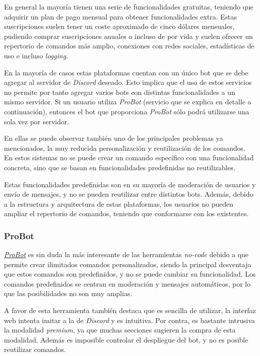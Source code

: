 En general la mayoría tienen una serie de funcionalidades gratuitas, teniendo que adquirir un plan de pago mensual para obtener funcionalidades extra. Estas suscripciones suelen tener un coste aproximado de cinco dólares mensuales, pudiendo comprar suscripciones anuales o incluso de por vida y suelen ofrecer un repertorio de comandos más amplio, conexiones con redes sociales, estadísticas de uso e incluso \textit{logging}.

En la mayoría de casos estas plataformas cuentan con un único bot que se debe agregar al servidor de \textit{Discord} deseado. Esto implica que el uso de estos servicios no permite por tanto agregar varios bots con distintas funcionalidades a un mismo servidor. Si un usuario utiliza \textit{ProBot} (servicio que se explica en detalle a continuación), entonces el bot que proporciona \textit{ProBot} sólo podrá utilizarse una sola vez por servidor.

En ellas se puede observar también uno de los principales problemas ya mencionados, la muy reducida personalización y reutilización de los comandos. En estos sistemas no se puede crear un comando específico con una funcionalidad concreta, sino que se basan en funcionalidades predefinidas no reutilizables.

Estas funcionalidades predefinidas son en su mayoría de moderación de usuarios y envío de mensajes, y no se pueden reutilizar entre distintos bots. Además, debido a la estructura y arquitectura de estas plataformas, los usuarios no pueden ampliar el repertorio de comandos, teniendo que conformarse con los existentes.

\subsubsection{ProBot}

\href{https://probot.io/}{\textit{ProBot}} es sin duda la más interesante de las herramientas \textit{no-code} debido a que permite crear ilimitados comandos personalizados, siendo la principal desventaja que estos comandos son predefinidos, y no se puede cambiar su funcionalidad. Los comandos predefinidos se centran en moderación y mensajes automáticos, por lo que las posibilidades no son muy amplias.

A favor de esta herramienta también destaca que es sencilla de utilizar, la interfaz web intenta imitar a la de \textit{Discord} y es intuitiva. Por contra, es bastante intrusiva la modalidad \textit{premium}, ya que muchas secciones sugieren la compra de esta modalidad. Además es imposible controlar el despliegue del bot, y no es posible reutilizar comandos.

